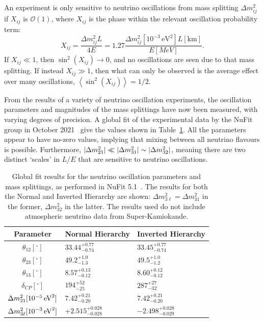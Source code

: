 An experiment is only sensitive to neutrino oscillations from mass splitting $\Delta m^{2}_{ij}$ if $X_{ij}$ is $\mathcal{O}(1)$, where $X_{ij}$ is the phase within the relevant oscillation probability term:
\begin{equation}\label{eq:nu_osc_phase}
    X_{ij} = \frac{\Delta m^{2}_{ij} L}{4E} = 1.27 \frac{\Delta m^{2}_{ij} [10^{-3}\,\si{\eV\squared}] L [\si{\km}]}{E [\si{MeV}]}.
\end{equation}
If $X_{ij}\ll 1$, then $\sin^{2}\left(X_{ij}\right)\to 0$, and no oscillations are seen due to that mass splitting. If instead $X_{ij}\gg 1$, then what can only be observed is the average effect over many oscillations, $\left<\sin^{2}\left(X_{ij}\right)\right> = 1/2$.

From the results of a variety of neutrino oscillation experiments, the oscillation parameters and magnitudes of the mass splittings have now been measured, with varying degrees of precision. A global fit of the experimental data by the NuFit group in October 2021~\cite{estebanFateHintsUpdated2020} give the values shown in Table~\ref{tab:nufit_osc_params}. All the parameters appear to have no-zero values, implying that mixing between all neutrino flavours is possible. Furthermore, $|\dmsq{}|\ll|\Delta m^{2}_{31}|\sim|\Delta m^{2}_{32}|$, meaning there are two distinct `scales' in $L/E$ that are sensitive to neutrino oscillations.

\begin{table}
    \centering
    \begin{tabular}{c p{2.2cm} p{2.2cm}}
        \hline
        Parameter   & Normal Hierarchy                       & Inverted Hierarchy  \\ \hline \hline
        $\theta_{12} [^{\circ}]$ & $33.44^{+0.77}_{-0.74}$  & $33.45^{+0.77}_{-0.74}$     \\
        $\theta_{23} [^{\circ}]$ & $49.2^{+1.0}_{-1.3}$     & $49.5^{+1.0}_{-1.2}$  \\
        $\theta_{13} [^{\circ}]$ & $8.57^{+0.13}_{-0.12}$   & $8.60^{+0.12}_{-0.12}$  \\
        $\delta_{CP} [^{\circ}]$ & $194^{+52}_{-25}$        & $287^{+27}_{-32}$   \\
        $\dmsq{} [10^{-5}\,\si{eV\squared}]$ & $7.42^{+0.21}_{-0.20}$ & $7.42^{+0.21}_{-0.20}$    \\
        $\Delta m^{2}_{3\ell} [10^{-3}\,\si{eV\squared}]$ & $+2.515^{+0.028}_{-0.028}$ & $-2.498^{+0.028}_{-0.029}$    \\
        \hline
    \end{tabular}
    \caption[Global Fit neutrino oscillation parameters]
    {Global fit results for the neutrino oscillation parameters and mass splittings, as performed in NuFit 5.1~\cite{estebanFateHintsUpdated2020}. The results for both the Normal and Inverted Hierarchy are shown: $\Delta m^{2}_{3\ell} = \Delta m^{2}_{31}$ in the former, $\Delta m^{2}_{32}$ in the latter. The results used do not include atmospheric neutrino data from Super-Kamiokande.}
    \label{tab:nufit_osc_params}
\end{table}

